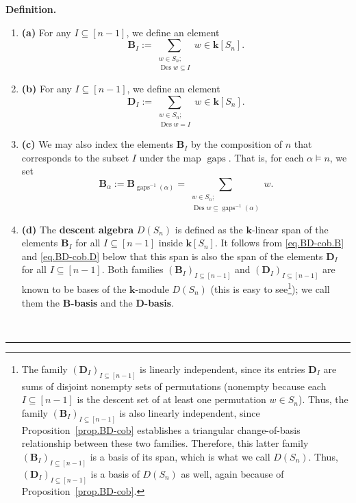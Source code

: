 \documentclass[12pt]{article}
\theoremstyle{definition}%
\theoremstyle{definition}%
\newtheorem{defn}[thm]{Definition}
\theoremstyle{remark}%
\newcommand{\tup}[1]{\left( #1 \right)}
\newcommand{\interval}[1]{\left[ #1 \right]} %
\newcommand{\kk}{\mathbf{k}}
\newcommand{\ksn}{\kk\left[S_n\right]}
\newcommand{\dsn}{D\left(S_n\right)}
\newcommand{\BB}{\mathbf{B}}
\newcommand{\DD}{\mathbf{D}}
\newcommand{\Des}{\operatorname{Des}}
\newcommand{\gaps}{\operatorname{gaps}}
\newcommand{\defin}[1]{\textbf{#1}}
\newenvironment{defn}[1][Definition]{\noindent\textbf{#1.} }{\ \rule{0.5em}{0.5em}}
\begin{document}
\begin{defn}
    \label{dsn_def}\ %
    \begin{enumerate}[]
        \item\textbf{(a)} For any $I \subseteq \interval{n-1}$, we define an element
        \[
        \BB_{I} := \sum_{\substack{w \in S_n; \\ \Des w \subseteq I}} w \in \ksn.
        \]
        \item\textbf{(b)} For any $I \subseteq \interval{n-1}$, we define an element
        \[
        \DD_{I} := \sum_{\substack{w \in S_n; \\ \Des w = I}} w \in \ksn.
        \]
        \item\textbf{(c)} We may also index the elements $\BB_{I}$ by the composition of $n$ that corresponds to the subset $I$ under the map $\gaps$.
        That is, for each $\alpha \models n$, we set
        \[
        \BB_{\alpha} := \BB_{\gaps^{-1}\tup{\alpha}}
        = \sum_{\substack{w \in S_n; \\ \Des  w \subseteq \gaps^{-1}\tup{\alpha}}} w .
        \]
        \item\textbf{(d)} The \defin{descent algebra} $\dsn$ is defined as the $\kk$-linear span of the
        elements $\BB_I$ for all $I \subseteq \interval{n-1}$ inside $\ksn$.
        It follows from \eqref{eq.BD-cob.B} and \eqref{eq.BD-cob.D} below
        that this span is also the span of the elements $\DD_I$ for all $I \subseteq \interval{n-1}$.
        Both families $\tup{\BB_I}_{I \subseteq \interval{n-1}}$ and
        $\tup{\DD_I}_{I \subseteq \interval{n-1}}$ are known to be bases of the $\kk$-module $\dsn$
        (this is easy to see\footnote{The family $\tup{\DD_I}_{I \subseteq \interval{n-1}}$
        is linearly independent, since its entries $\DD_I$ are sums of disjoint nonempty
        sets of permutations
		(nonempty because each $I \subseteq \interval{n-1}$ is the descent set of at
        least one permutation $w \in S_n$).
        Thus, the family $\tup{\BB_I}_{I \subseteq \interval{n-1}}$ is also linearly
        independent, since Proposition~\ref{prop.BD-cob} establishes a
        triangular change-of-basis relationship between these two families.
        Therefore, this latter family $\tup{\BB_I}_{I \subseteq \interval{n-1}}$
        is a basis of its span, which is what we call $\dsn$.
        Thus, $\tup{\DD_I}_{I \subseteq \interval{n-1}}$ is a basis of $\dsn$ as well,
        again because of Proposition~\ref{prop.BD-cob}.});
        we call them the \defin{$\BB$-basis} and the
        \defin{$\DD$-basis}.
    \end{enumerate}
\end{defn}
\end{document}
